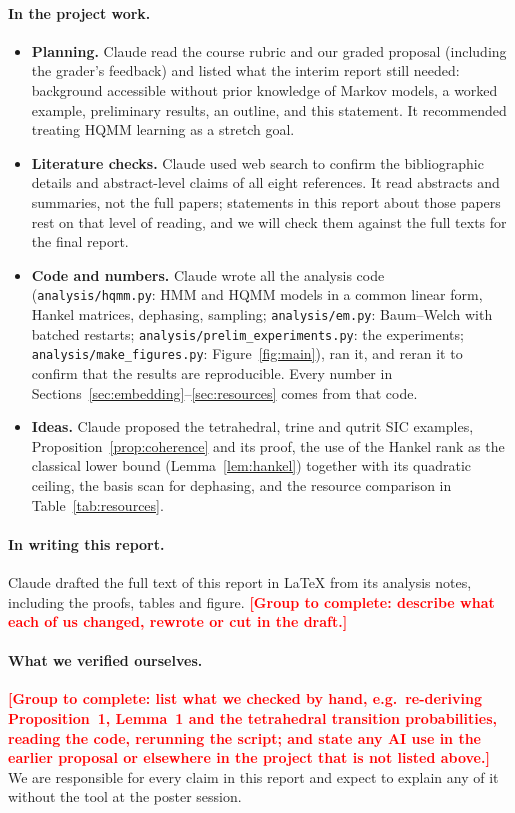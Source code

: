 \documentclass[11pt]{article}
\newcommand{\groupnote}[1]{\textcolor{red}{\textbf{[Group to complete: #1]}}}
\begin{document}
\paragraph{In the project work.}
\begin{itemize}\sloppy
\item \textbf{Planning.} Claude read the course rubric and our graded proposal (including the grader's feedback) and listed what the interim report still needed: background accessible without prior knowledge of Markov models, a worked example, preliminary results, an outline, and this statement. It recommended treating HQMM learning as a stretch goal.
\item \textbf{Literature checks.} Claude used web search to confirm the bibliographic details and abstract-level claims of all eight references. It read abstracts and summaries, not the full papers; statements in this report about those papers rest on that level of reading, and we will check them against the full texts for the final report.
\item \textbf{Code and numbers.} Claude wrote all the analysis code (\texttt{analysis/hqmm.py}: HMM and HQMM models in a common linear form, Hankel matrices, dephasing, sampling; \texttt{analysis/em.py}: Baum--Welch with batched restarts; \texttt{analysis/prelim\_experiments.py}: the experiments; \texttt{analysis/make\_figures.py}: Figure~\ref{fig:main}), ran it, and reran it to confirm that the results are reproducible. Every number in Sections~\ref{sec:embedding}--\ref{sec:resources} comes from that code.
\item \textbf{Ideas.} Claude proposed the tetrahedral, trine and qutrit SIC examples, Proposition~\ref{prop:coherence} and its proof, the use of the Hankel rank as the classical lower bound (Lemma~\ref{lem:hankel}) together with its quadratic ceiling, the basis scan for dephasing, and the resource comparison in Table~\ref{tab:resources}.
\end{itemize}

\paragraph{In writing this report.} Claude drafted the full text of this report in \LaTeX{} from its analysis notes, including the proofs, tables and figure. \groupnote{describe what each of us changed, rewrote or cut in the draft.}

\paragraph{What we verified ourselves.} \groupnote{list what we checked by hand, e.g.\ re-deriving Proposition~1, Lemma~1 and the tetrahedral transition probabilities, reading the code, rerunning the script; and state any AI use in the earlier proposal or elsewhere in the project that is not listed above.} We are responsible for every claim in this report and expect to explain any of it without the tool at the poster session.
\end{document}
